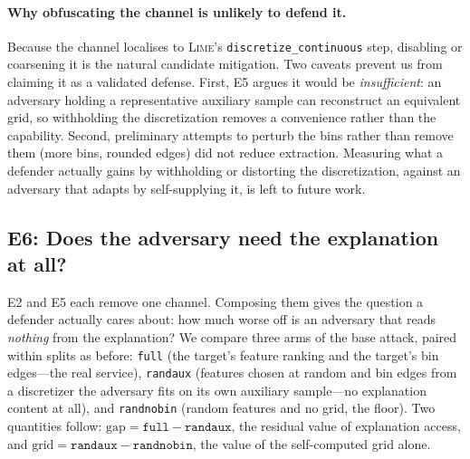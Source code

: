 \documentclass[sigconf,anonymous,review]{acmart}
\begin{document}
\paragraph{Why obfuscating the channel is unlikely to defend it.} Because the channel localises to \textsc{Lime}'s
\texttt{discretize\_continuous} step, disabling or coarsening it is the natural candidate mitigation.
Two caveats prevent us from claiming it as a validated defense. First, E5 argues it would be
\emph{insufficient}: an adversary holding a representative auxiliary sample can reconstruct an
equivalent grid, so withholding the discretization removes a convenience rather than the capability.
Second, preliminary attempts to perturb the bins rather than remove them (more bins, rounded edges)
did not reduce extraction. Measuring what a defender actually gains by withholding or distorting the
discretization, against an adversary that adapts by self-supplying it, is left to future work.

\subsection{E6: Does the adversary need the explanation at all?}
\label{subsec:e6}
E2 and E5 each remove one channel. Composing them gives the question a defender actually cares about:
how much worse off is an adversary that reads \emph{nothing} from the explanation? We compare three
arms of the base attack, paired within splits as before:
\texttt{full} (the target's feature ranking and the target's bin edges---the real service),
\texttt{randaux} (features chosen at random and bin edges from a discretizer the adversary fits on
its own auxiliary sample---no explanation content at all), and \texttt{randnobin} (random features
and no grid, the floor). Two quantities follow: $\text{gap}=\texttt{full}-\texttt{randaux}$, the
residual value of explanation access, and $\text{grid}=\texttt{randaux}-\texttt{randnobin}$, the
value of the self-computed grid alone.
\end{document}
